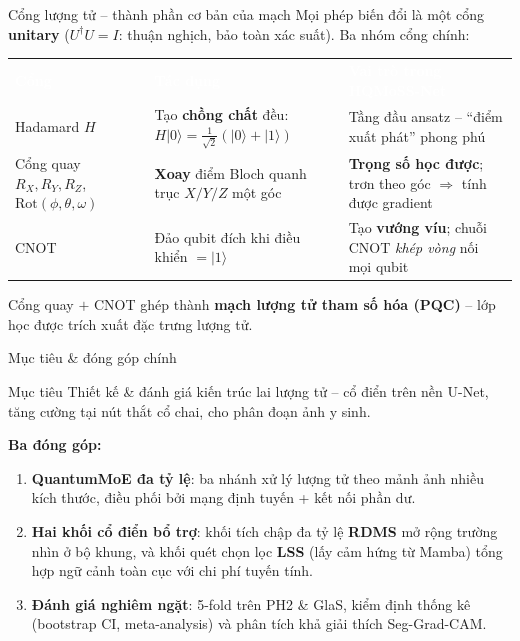 \documentclass[aspectratio=169,11pt]{beamer}
\newcommand{\hl}[1]{\textcolor{hcmusblue}{\textbf{#1}}}
\newcommand{\acc}[1]{\textcolor{hcmusaccent}{\textbf{#1}}}
\begin{document}
\begin{frame}{Cổng lượng tử -- thành phần cơ bản của mạch}
  \small Mọi phép biến đổi là một cổng \hl{unitary} ($U^\dagger U = I$: thuận nghịch, bảo toàn xác suất). Ba nhóm cổng chính:
  \vspace{0.5em}
  \begin{center}\footnotesize
  \renewcommand{\arraystretch}{1.35}
  \begin{tabular}{>{\raggedright\arraybackslash}p{2.5cm} >{\raggedright\arraybackslash}p{4.1cm} >{\raggedright\arraybackslash}p{4.9cm}}
    \rowcolor{hcmusblue}
    \textcolor{white}{\textbf{Cổng}} & \textcolor{white}{\textbf{Tác dụng}} & \textcolor{white}{\textbf{Vai trò trong HQMoSS-Net}} \\
    Hadamard $H$ & Tạo \hl{chồng chất} đều: $H|0\rangle=\tfrac{1}{\sqrt2}(|0\rangle{+}|1\rangle)$ & Tầng đầu ansatz -- ``điểm xuất phát'' phong phú \\
    \rowcolor{softgray}
    Cổng quay $R_X,R_Y,R_Z$, $\mathrm{Rot}(\phi,\theta,\omega)$ & \hl{Xoay} điểm Bloch quanh trục $X/Y/Z$ một góc & \acc{Trọng số học được}; trơn theo góc $\Rightarrow$ tính được gradient \\
    CNOT & Đảo qubit đích khi điều khiển $=|1\rangle$ & Tạo \hl{vướng víu}; chuỗi CNOT \emph{khép vòng} nối mọi qubit \\
    \bottomrule
  \end{tabular}
  \end{center}
  \vspace{0.3em}
  {\footnotesize\centering Cổng quay $+$ CNOT ghép thành \hl{mạch lượng tử tham số hóa (PQC)} -- lớp học được trích xuất đặc trưng lượng tử.\par}
\end{frame}

\begin{frame}{Mục tiêu \& đóng góp chính}
  \begin{block}{Mục tiêu}
    Thiết kế \& đánh giá kiến trúc lai lượng tử -- cổ điển trên nền U-Net, tăng cường tại nút thắt cổ chai, cho phân đoạn ảnh y sinh.
  \end{block}
  \textbf{Ba đóng góp:}
  \begin{enumerate}
    \item \hl{QuantumMoE đa tỷ lệ}: ba nhánh xử lý lượng tử theo mảnh ảnh nhiều kích thước, điều phối bởi mạng định tuyến + kết nối phần dư.
    \item \hl{Hai khối cổ điển bổ trợ}: khối tích chập đa tỷ lệ \hl{RDMS} mở rộng trường nhìn ở bộ khung, và khối quét chọn lọc \hl{LSS} (lấy cảm hứng từ Mamba) tổng hợp ngữ cảnh toàn cục với chi phí tuyến tính.
    \item \hl{Đánh giá nghiêm ngặt}: 5-fold trên PH2 \& GlaS, kiểm định thống kê (bootstrap CI, meta-analysis) và phân tích khả giải thích Seg-Grad-CAM.
  \end{enumerate}
\end{frame}
\end{document}
